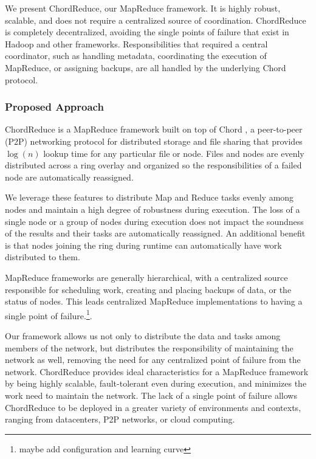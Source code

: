 \documentclass{article}
\begin{document}
We present ChordReduce, our MapReduce framework.  It is highly robust, scalable, and does not require a centralized source of coordination.  ChordReduce is completely decentralized, avoiding the single points of failure that exist in Hadoop and other frameworks. Responsibilities  that required a central coordinator, such as handling metadata, coordinating the execution of MapReduce, or assigning backups,  are all handled by the underlying Chord protocol.

\subsubsection*{Proposed Approach}

ChordReduce is a MapReduce framework built on top of Chord \cite{Chord}, a peer-to-peer (P2P) networking protocol for distributed storage and file sharing that provides $\log(n)$ lookup time for any particular file or node.
Files and nodes are evenly distributed across a ring overlay and organized so the responsibilities of a failed node are automatically reassigned. 

We leverage these features to distribute Map and Reduce tasks evenly among nodes and maintain a high degree of robustness during execution.  
The loss of a single node or a group of nodes during execution does not impact the soundness of the results and their tasks are automatically reassigned. 
An additional benefit is that nodes joining the ring during runtime can automatically have work distributed to them.

MapReduce frameworks are generally hierarchical, with a centralized source responsible for scheduling work, creating and placing backups of data, or the status of nodes.  This leads centralized MapReduce implementations to having a single point of failure.\footnote{maybe add configuration and learning curve}.

Our framework allows us not only to distribute the data and tasks among members of the network, but distributes the responsibility of maintaining the network as well, removing the need for any centralized point of failure from the network.
ChordReduce provides ideal characteristics for a MapReduce framework by being highly scalable, fault-tolerant even during execution, and minimizes the work need to maintain the network.  The lack of a single point of failure allows ChordReduce to be deployed in a greater variety of environments and contexts, ranging from datacenters, P2P networks, or cloud computing.
\end{document}
